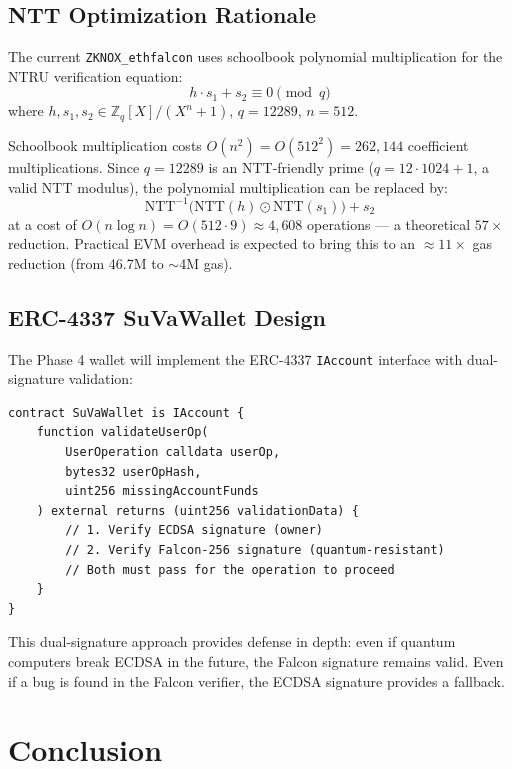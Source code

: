 \documentclass[11pt,a4paper]{article}
\begin{document}
\subsection{NTT Optimization Rationale}

The current \texttt{ZKNOX\_ethfalcon} uses schoolbook polynomial multiplication for the NTRU verification equation:
\[
  h \cdot s_1 + s_2 \equiv 0 \pmod{q}
\]
where $h, s_1, s_2 \in \mathbb{Z}_q[X]/(X^n + 1)$, $q = 12289$, $n = 512$.

Schoolbook multiplication costs $O(n^2) = O(512^2) = 262{,}144$ coefficient multiplications. Since $q = 12289$ is an NTT-friendly prime ($q = 12 \cdot 1024 + 1$, a valid NTT modulus), the polynomial multiplication can be replaced by:
\[
  \text{NTT}^{-1}\bigl(\text{NTT}(h) \odot \text{NTT}(s_1)\bigr) + s_2
\]
at a cost of $O(n \log n) = O(512 \cdot 9) \approx 4{,}608$ operations --- a theoretical $57\times$ reduction. Practical EVM overhead is expected to bring this to an $\approx 11\times$ gas reduction (from 46.7M to $\sim$4M gas).

\subsection{ERC-4337 SuVaWallet Design}

The Phase 4 wallet will implement the ERC-4337 \texttt{IAccount} interface with dual-signature validation:

\begin{lstlisting}[style=solidity, caption={SuVaWallet.sol interface (Phase 4 preview)}]
contract SuVaWallet is IAccount {
    function validateUserOp(
        UserOperation calldata userOp,
        bytes32 userOpHash,
        uint256 missingAccountFunds
    ) external returns (uint256 validationData) {
        // 1. Verify ECDSA signature (owner)
        // 2. Verify Falcon-256 signature (quantum-resistant)
        // Both must pass for the operation to proceed
    }
}
\end{lstlisting}

This dual-signature approach provides defense in depth: even if quantum computers break ECDSA in the future, the Falcon signature remains valid. Even if a bug is found in the Falcon verifier, the ECDSA signature provides a fallback.

\section{Conclusion}
\end{document}

